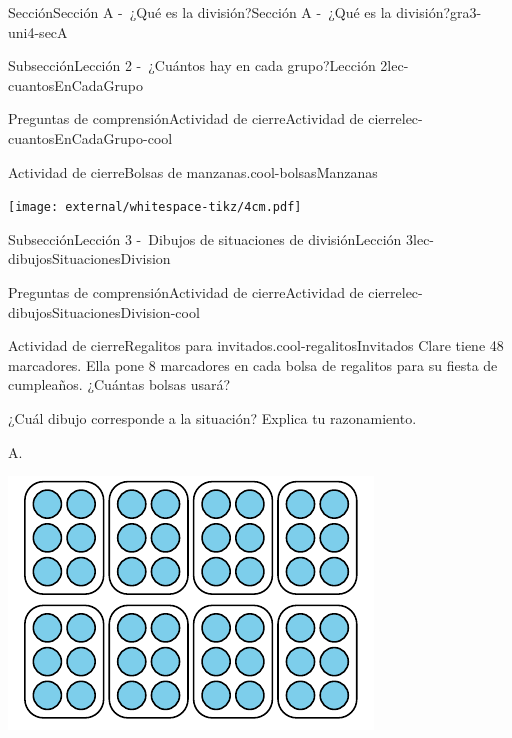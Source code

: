 \begin{sectionptx}{Sección}{Sección A -~¿Qué es la división?}{}{Sección A -~¿Qué es la división?}{}{}{gra3-uni4-secA}
\begin{subsectionptx}{Subsección}{Lección 2 -~¿Cuántos hay en cada grupo?}{}{Lección 2}{}{}{lec-cuantosEnCadaGrupo}
\begin{reading-questions-subsubsection-numberless}{Preguntas de comprensión}{Actividad de cierre}{}{Actividad de cierre}{}{}{lec-cuantosEnCadaGrupo-cool}
\begin{project}{Actividad de cierre}{Bolsas de manzanas.}{cool-bolsasManzanas}
\begin{image}{0}{1}{0}{}
\texttt{[image: external/whitespace-tikz/4cm.pdf]}
\end{image}%
\end{project}%
\end{reading-questions-subsubsection-numberless}
\end{subsectionptx}
%
%
\typeout{************************************************}
\typeout{************************************************}
%
\begin{subsectionptx}{Subsección}{Lección 3 -~Dibujos de situaciones de división}{}{Lección 3}{}{}{lec-dibujosSituacionesDivision}
%
%
\clearpage
\typeout{************************************************}
\typeout{************************************************}
%
\begin{reading-questions-subsubsection-numberless}{Preguntas de comprensión}{Actividad de cierre}{}{Actividad de cierre}{}{}{lec-dibujosSituacionesDivision-cool}
\begin{project}{Actividad de cierre}{Regalitos para invitados.}{cool-regalitosInvitados}%
Clare tiene 48 marcadores. Ella pone 8 marcadores en cada bolsa de regalitos para su fiesta de cumpleaños. ¿Cuántas bolsas usará?%
\par
¿Cuál dibujo corresponde a la situación? Explica tu razonamiento.%
\begin{sidebyside}{2}{0}{0}{0}%
\begin{sbspanel}{0.5}%
A.%
\par
\includegraphics[max width=\linewidth, center]{external/svg-source/tikz-file-246306.pdf}
\end{sbspanel}%

\end{sidebyside}
\end{project}
\end{reading-questions-subsubsection-numberless}
\end{subsectionptx}
\end{sectionptx}
